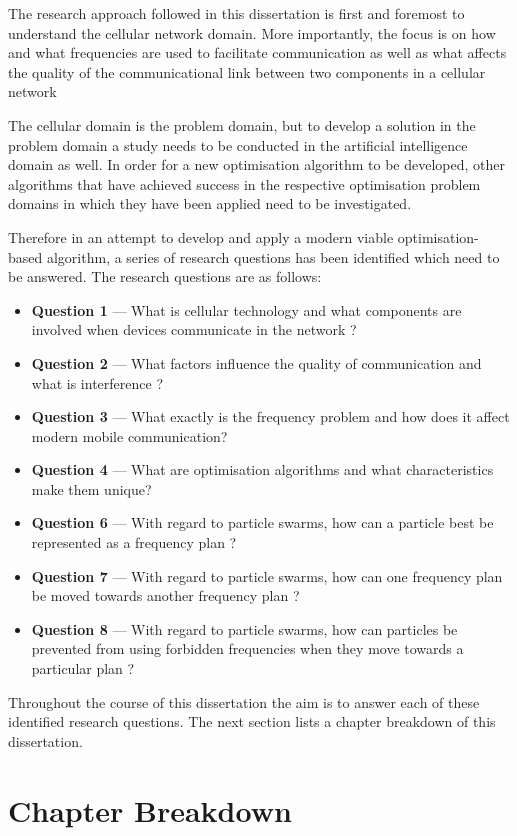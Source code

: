 The research approach followed in this dissertation is first and foremost to understand the cellular network domain. More importantly, the focus is on how and what frequencies are used to facilitate communication as well as what affects the quality of the communicational link between two components in a cellular network 

The cellular domain is the problem domain, but to develop a solution in the problem domain a study needs to be conducted in the artificial intelligence domain as well. In order for a new optimisation algorithm to be developed, other algorithms that have achieved success in the respective optimisation problem domains in which they have been applied need to be investigated.

Therefore in an attempt to develop and apply a modern viable optimisation-based algorithm, a series of research questions has been identified which need to be answered. The research questions are as follows:
\begin{itemize}
\item \textbf{Question 1} --- What is cellular technology and what components are involved when devices communicate in the network ?
\item \textbf{Question 2} --- What factors influence the quality of communication and what is interference ?
\item \textbf{Question 3} --- What exactly is the frequency problem and how does it affect modern mobile communication?
\item \textbf{Question 4} --- What are optimisation algorithms and what characteristics make them unique?
\item \textbf{Question 6} --- With regard to particle swarms, how can a particle best be represented as a frequency plan ?
\item \textbf{Question 7} --- With regard to particle swarms, how can one frequency plan be moved towards another frequency plan ?
\item \textbf{Question 8} --- With regard to particle swarms, how can particles be prevented from using forbidden frequencies when they move towards a particular plan ?
\end{itemize}

Throughout the course of this dissertation the aim is to answer each of these identified research questions. The next section lists a chapter breakdown of this dissertation.

\section {Chapter Breakdown}
